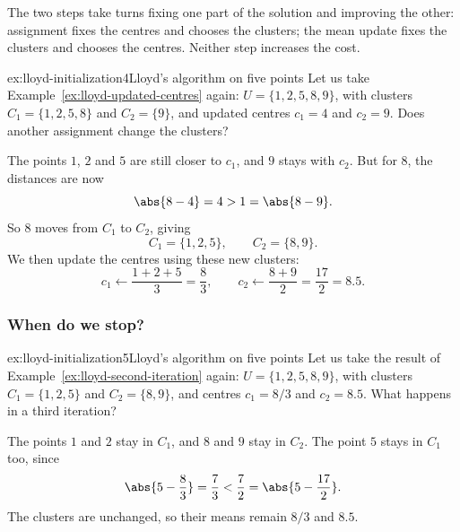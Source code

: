 \documentclass[a4paper,12pt,oneside]{report}
\begin{document}
The two steps take turns fixing one part of the solution and improving
the other: assignment fixes the centres and chooses the clusters;
the mean update fixes the clusters and chooses the centres. Neither
step increases the cost.

\begin{framedexamplepart}{ex:lloyd-initialization}{4}{Lloyd's algorithm on five points}
\label{ex:lloyd-second-iteration}
Let us take Example~\ref{ex:lloyd-updated-centres} again:
$U=\{1,2,5,8,9\}$, with clusters $C_1=\{1,2,5,8\}$ and
$C_2=\{9\}$, and updated centres $c_1=4$ and $c_2=9$.
Does another assignment change the clusters?

The points $1$, $2$ and $5$ are still closer to $c_1$, and $9$ stays
with $c_2$. But for $8$, the distances are now
\[
  \abs{8-4}=4>1=\abs{8-9}.
\]
So $8$ moves from $C_1$ to $C_2$, giving
\[
  C_1=\{1,2,5\},\qquad C_2=\{8,9\}.
\]
We then update the centres using these new clusters:
\[
  c_1\gets\frac{1+2+5}{3}=\frac83,\qquad
  c_2\gets\frac{8+9}{2}=\frac{17}{2}=8.5.
\]
\begin{center}
\end{center}
\end{framedexamplepart}

\subsubsection{When do we stop?}
\label{sec:lloyd-stopping}

\begin{framedexamplepart}{ex:lloyd-initialization}{5}{Lloyd's algorithm on five points}
\label{ex:lloyd-convergence}
Let us take the result of Example~\ref{ex:lloyd-second-iteration}
again: $U=\{1,2,5,8,9\}$, with clusters $C_1=\{1,2,5\}$ and
$C_2=\{8,9\}$, and centres $c_1=8/3$ and $c_2=8.5$.
What happens in a third iteration?

The points $1$ and $2$ stay in $C_1$, and $8$ and $9$ stay in $C_2$.
The point $5$ stays in $C_1$ too, since
\[
  \abs{5-\frac83}=\frac73
  <\frac72=\abs{5-\frac{17}{2}}.
\]
The clusters are unchanged, so their means remain $8/3$ and $8.5$.
\end{framedexamplepart}
\end{document}
